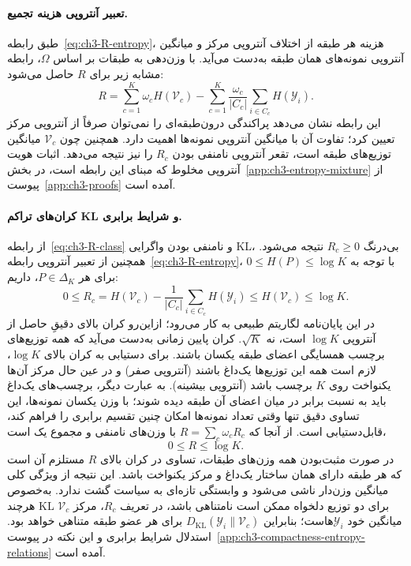 \paragraph{تعبیر آنتروپی هزینه تجمیع.}
طبق رابطه~\eqref{eq:ch3-R-entropy}، هزینه هر طبقه از اختلاف آنتروپی مرکز و میانگین آنتروپی نمونه‌های همان طبقه به‌دست می‌آید. با وزن‌دهی به طبقات بر اساس $\Omega$، رابطه مشابه زیر برای $R$ حاصل می‌شود:
\begin{equation}\label{eq:ch3-R-average-entropy}
\boxed{R=\sum_{c=1}^{K}\omega_c H(\mathcal V_c)
-\sum_{c=1}^{K}\frac{\omega_c}{|C_c|}
\sum_{i\in C_c}H(\mathscr Y_i).}
\end{equation}
این رابطه نشان می‌دهد پراکندگی درون‌طبقه‌ای را نمی‌توان صرفاً از آنتروپی مرکز تعیین کرد؛ تفاوت آن با میانگین آنتروپی نمونه‌ها اهمیت دارد. همچنین چون $\mathcal V_c$ میانگین توزیع‌های طبقه است، تقعر آنتروپی نامنفی بودن $R_c$ را نیز نتیجه می‌دهد. اثبات هویت آنتروپی مخلوط که مبنای
این رابطه است، در بخش~\ref{app:ch3-entropy-mixture}
از پیوست~\ref{app:ch3-proofs} آمده است.

\paragraph{کران‌های تراکم KL و شرایط برابری.}
از رابطه~\eqref{eq:ch3-R-class} و نامنفی بودن
واگرایی KL، بی‌درنگ $R_c\ge0$ نتیجه می‌شود.
همچنین از تعبیر آنتروپی
رابطه~\eqref{eq:ch3-R-entropy}، با توجه به
$0\le H(P)\le\log K$ برای هر $P\in\Delta_K$، داریم:
\begin{equation}\label{eq:ch3-R-KL-bounds}
\boxed{
0\le R_c
=H(\mathcal V_c)
-\frac1{|C_c|}\sum_{i\in C_c}H(\mathscr Y_i)
\le H(\mathcal V_c)\le\log K.
}
\end{equation}
در این پایان‌نامه لگاریتم طبیعی به کار می‌رود؛
ازاین‌رو کران بالای دقیقِ حاصل از آنتروپی
$\log K$ است، نه $\sqrt K$.
کران پایین زمانی به‌دست می‌آید که همه
توزیع‌های برچسب همسایگی اعضای طبقه یکسان باشند.
برای دستیابی به کران بالای $\log K$،
لازم است همه این توزیع‌ها یک‌داغ باشند
(آنتروپی صفر) و در عین حال مرکز آن‌ها
یکنواخت روی $K$ برچسب باشد
(آنتروپی بیشینه).
به عبارت دیگر، برچسب‌های یک‌داغ باید
به نسبت برابر در میان اعضای آن طبقه دیده شوند؛
با وزن یکسان نمونه‌ها، این تساوی دقیق تنها
وقتی تعداد نمونه‌ها امکان چنین تقسیم برابری را
فراهم کند، قابل‌دستیابی است.
از آنجا که $R=\sum_c\omega_cR_c$
با وزن‌های نامنفی و مجموع یک است،
\begin{equation}\label{eq:ch3-R-weighted-bounds}
\boxed{0\le R\le\log K.}
\end{equation}
در صورت مثبت‌بودن همه وزن‌های طبقات،
تساوی در کران بالای $R$ مستلزم آن است
که هر طبقه دارای همان ساختار یک‌داغ
و مرکز یکنواخت باشد. این نتیجه از
ویژگی کلی میانگین وزن‌دار ناشی می‌شود
و وابستگی تازه‌ای به سیاست گشت ندارد.
به‌خصوص هرچند KL برای دو توزیع دلخواه
ممکن است نامتناهی باشد، در تعریف $R_c$،
مرکز $\mathcal V_c$ میانگین خود
$\mathscr Y_i$هاست؛ بنابراین
$D_{\mathrm{KL}}(\mathscr Y_i\|\mathcal V_c)$
برای هر عضو طبقه متناهی خواهد بود.
استدلال شرایط برابری و این نکته در
پیوست~\ref{app:ch3-compactness-entropy-relations} آمده است.


